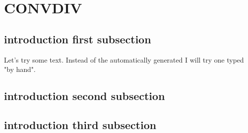 \documentclass[crop=false]{standalone}
\begin{document}
\section{CONVDIV}

\subsection{introduction first subsection}
Let's try some text. Instead of the automatically generated
I will try one typed "by hand".

\subsection{introduction second subsection}


\subsection{introduction third subsection}

\end{document}

